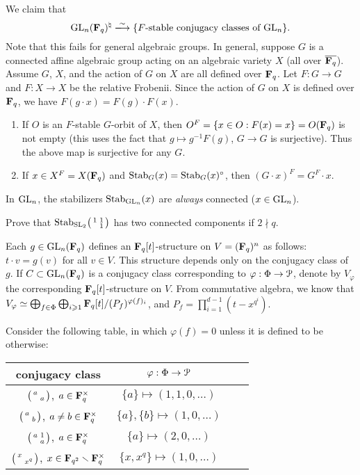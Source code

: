 \documentclass{article}
\begin{document}
We claim that 
\[
  \generallinear_n(\dF_q)^\natural\isomorphism \{\text{$F$-stable conjugacy classes of $\generallinear_n$}\} . 
\]
Note that this fails for general algebraic groups. In general, suppose $G$ 
is a connected affine algebraic group acting on an algebraic variety $X$ (all 
over $\overline{\mathbf{F}_q}$). Assume $G$, $X$, and the action of $G$ on $X$ are all 
defined over $\mathbf{F}_q$. Let $F:G\to G$ and $F:X\to X$ be the relative Frobenii. 
Since the action of $G$ on $X$ is defined over $\mathbf{F}_q$, we have 
$F(g\cdot x) = F(g) \cdot F(x)$. 
\begin{enumerate}
  \item If $O$ is an $F$-stable $G$-orbit of $X$, then 
    $O^F=\{x\in O:F(x)=x\}=O(\mathbf{F}_q)$ is not empty (this uses the fact that 
    $g\mapsto g^{-1} F(g)$, $G\to G$ is surjective). Thus the above map is 
    surjective for any $G$. 
  \item If $x\in X^F=X(\mathbf{F}_q)$ and $\operatorname{Stab}_G(x) = \operatorname{Stab}_G(x)^\circ$, 
    then $(G\cdot x)^F = G^F\cdot x$. 
\end{enumerate}

In $\operatorname{GL}_n$, the stabilizers $\operatorname{Stab}_{\operatorname{GL}_n}(x)$ are 
\emph{always} connected ($x\in \operatorname{GL}_n$). 

\begin{exercise}
Prove that $\operatorname{Stab}_{\operatorname{SL}_2}\bigl(\begin{smallmatrix} 1 & 1 \\  & 1 \end{smallmatrix} \bigr)$ has two connected 
components if $2\nmid q$. 
\end{exercise}

Each $g\in \operatorname{GL}_n(\mathbf{F}_q)$ defines an $\mathbf{F}_q[t]$-structure on 
$V=(\mathbf{F}_q)^n$ as follows: $t\cdot v = g(v)$ for all $v\in V$. This structure 
depends only on the conjugacy class of $g$. If 
$C\subset \operatorname{GL}_n(\mathbf{F}_q)$ is a conjugacy class corresponding to 
$\varphi:\Phi \to \mathcal{P}$, denote by $V_\varphi$ the corresponding 
$\mathbf{F}_q[t]$-structure on $V$. From commutative algebra, we know that 
$V_\varphi \simeq \bigoplus_{f\in \Phi} \bigoplus_{i\geqslant 1} \mathbf{F}_q[t] / (P_f)^{\varphi(f)_i}$, and 
$P_f = \prod_{i=1}^{d-1} (t-x^{q^i})$. 

\begin{example}[$\generallinear_2(\dF_q)$]
Consider the following table, in which $\varphi(f)=0$ unless it is defined to 
be otherwise:
\begin{center}
\begin{tabular}{c|ccc}
conjugacy class & $\varphi:\Phi\to \mathcal{P}$ \\ \hline
$\bigl(\begin{smallmatrix} a &  \\  & a \end{smallmatrix} \bigr)$, $a\in \mathbf{F}_q^\times$ & $\{a\}\mapsto (1,1,0,\ldots)$ \\
$\bigl(\begin{smallmatrix} a &  \\  & b \end{smallmatrix} \bigr)$, $a\ne b\in \mathbf{F}_q^\times$ & $\{a\},\{b\}\mapsto (1,0,\dots)$ \\
$\bigl(\begin{smallmatrix} a & 1 \\  & a \end{smallmatrix} \bigr)$, $a\in \mathbf{F}_q^\times$ & $\{a\}\mapsto (2,0,\dots)$ \\
$\bigl(\begin{smallmatrix} x &  \\  & x^q \end{smallmatrix} \bigr)$, $x\in \mathbf{F}_{q^2}\smallsetminus \mathbf{F}_q^\times$ & $\{x,x^q\}\mapsto (1,0,\dots)$
\end{tabular}
\end{center}
\end{example}
\end{document}
